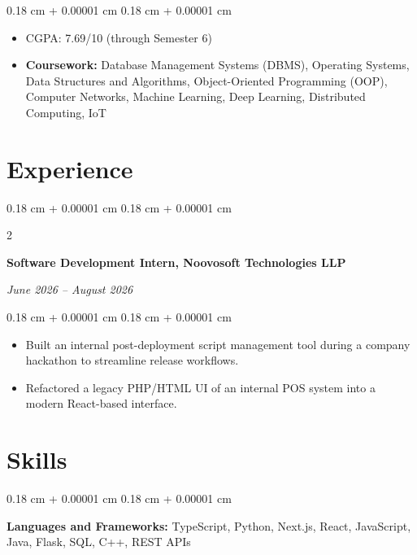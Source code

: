 \documentclass[10pt, letterpaper]{article}
\newenvironment{highlights}{
    \begin{itemize}[
        topsep=0.09 cm,
        parsep=0.09 cm,
        partopsep=0pt,
        itemsep=0pt,
        leftmargin=0.4 cm + 10pt
    ]
}{
    \end{itemize}
} %
\newenvironment{onecolentry}{
    \begin{adjustwidth}{
        0.18 cm + 0.00001 cm
    }{
        0.18 cm + 0.00001 cm
    }
}{
    \end{adjustwidth}
} %
\newenvironment{twocolentry}[2][]{
    \onecolentry
    \def\secondColumn{#2}
    \setcolumnwidth{\fill, 4.5 cm}
    \begin{paracol}{2}
}{
    \switchcolumn \raggedleft \secondColumn
    \end{paracol}
    \endonecolentry
} %
\begin{document}
        \vspace{0.02 cm}
        \begin{onecolentry}
            \begin{highlights}
                \item CGPA: 7.69/10 (through Semester 6)
                \item \textbf{Coursework:} Database Management Systems (DBMS), Operating Systems, Data Structures and Algorithms, Object-Oriented Programming (OOP), Computer Networks, Machine Learning, Deep Learning, Distributed Computing, IoT
            \end{highlights}
        \end{onecolentry}



    \section{Experience}

        \begin{twocolentry}{
        \textit{June 2026 -- August 2026}}
            \textbf{Software Development Intern, Noovosoft Technologies LLP}
        \end{twocolentry}

        \vspace{0.02 cm}
        \begin{onecolentry}
            \begin{highlights}
                \item Built an internal post-deployment script management tool during a company hackathon to streamline release workflows.
                \item Refactored a legacy PHP/HTML UI of an internal POS system into a modern React-based interface.
            \end{highlights}
        \end{onecolentry}

    \section{Skills}



        
        \begin{onecolentry}
            \textbf{Languages and Frameworks:} TypeScript, Python, Next.js, React, JavaScript, Java, Flask, SQL, C++, REST APIs
        \end{onecolentry}
\end{document}
